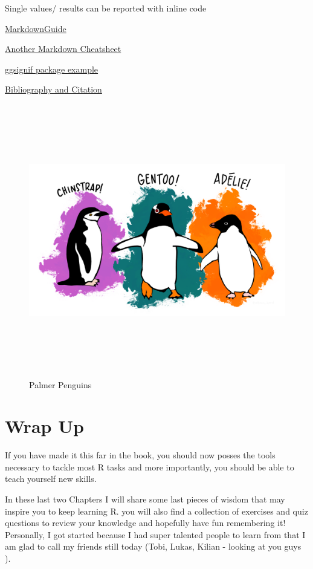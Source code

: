 \documentclass[
]{book}
\begin{document}
Single values/ results can be reported with inline code

\href{https://www.markdownguide.org/basic-syntax/}{MarkdownGuide}

\href{https://www.markdownguide.org/cheat-sheet/}{Another Markdown Cheatsheet}

\href{https://statisticsglobe.com/ggsignif-package-r}{ggsignif package example}

\href{https://bookdown.org/yihui/rmarkdown-cookbook/bibliography.html}{Bibliography and Citation}

\begin{figure}
\centering
\includegraphics[width=\textwidth,height=4.6875in]{./img/palmer_penguins.png}
\caption{Palmer Penguins}
\end{figure}

\chapter*{Wrap Up}\label{wrap-up}

If you have made it this far in the book, you should now posses the tools necessary to tackle most R tasks and more importantly, you should be able to teach yourself new skills.

In these last two Chapters I will share some last pieces of wisdom that may inspire you to keep learning R.
you will also find a collection of exercises and quiz questions to review your knowledge and hopefully have fun remembering it!
Personally, I got started because I had super talented people to learn from that I am glad to call my friends still today (Tobi, Lukas, Kilian - looking at you guys ).
\end{document}
